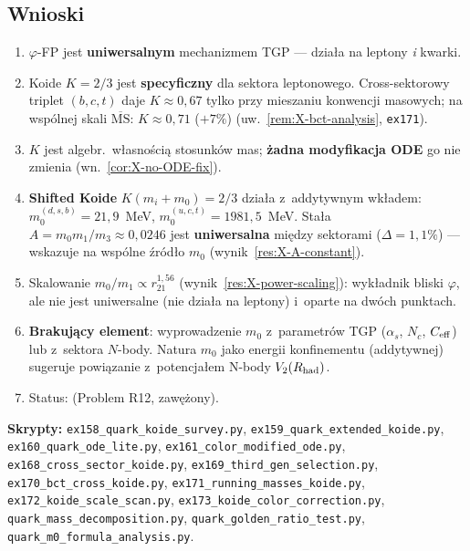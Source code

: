 \subsection{Wnioski}\label{app:X-wnioski}

\begin{enumerate}[nosep]
  \item $\varphi$-FP jest \textbf{uniwersalnym} mechanizmem TGP ---
        dzia\l{}a na leptony \emph{i} kwarki.
  \item Koide $K = 2/3$ jest \textbf{specyficzny} dla sektora leptonowego.
        Cross-sektorowy triplet $(b, c, t)$ daje $K \approx 0{,}67$
        tylko przy mieszaniu konwencji masowych; na wsp\'olnej skali
        $\overline{\text{MS}}$: $K \approx 0{,}71$ ($+7\%$)
        (uw.~\ref{rem:X-bct-analysis}, \texttt{ex171}).
  \item $K$ jest algebr.\ w\l{}asno\'sci\k{a} stosunk\'ow mas;
        \textbf{\.zadna modyfikacja ODE} go nie zmienia (wn.~\ref{cor:X-no-ODE-fix}).
  \item \textbf{Shifted Koide} $K(m_i + m_0) = 2/3$ dzia\l{}a
        z~addytywnym wk\l{}adem:
        $m_0^{(d,s,b)} = 21{,}9$~MeV,\;
        $m_0^{(u,c,t)} = 1981{,}5$~MeV.
        Sta\l{}a $A = m_0 m_1/m_3 \approx 0{,}0246$ jest
        \textbf{uniwersalna} mi\k{e}dzy sektorami ($\Delta = 1{,}1\%$)
        --- wskazuje na wsp\'olne \'zr\'od\l{}o $m_0$ (wynik~\ref{res:X-A-constant}).
  \item Skalowanie $m_0/m_1 \propto r_{21}^{1{,}56}$ (wynik~\ref{res:X-power-scaling}):
        wyk\l{}adnik bliski $\varphi$, ale nie jest uniwersalne (nie dzia\l{}a
        na leptony) i~oparte na dw\'och punktach.
  \item \textbf{Brakuj\k{a}cy element}: wyprowadzenie $m_0$ z~parametr\'ow TGP
        ($\alpha_s$, $N_c$, $C_{\rm eff}$) lub z~sektora $N$-body.
        Natura $m_0$ jako energii konfinementu (addytywnej) sugeruje
        powi\k{a}zanie z~potencja\l{}em N-body $V_2(R_{\rm had})$.
  \item Status:  (Problem R12, zaw\k{e}\.zony).
\end{enumerate}

\noindent\textbf{Skrypty:}
\texttt{ex158\_quark\_koide\_survey.py},
\texttt{ex159\_quark\_extended\_koide.py},
\texttt{ex160\_quark\_ode\_lite.py},
\texttt{ex161\_color\_modified\_ode.py},
\texttt{ex168\_cross\_sector\_koide.py},
\texttt{ex169\_third\_gen\_selection.py},
\texttt{ex170\_bct\_cross\_koide.py},
\texttt{ex171\_running\_masses\_koide.py},
\texttt{ex172\_koide\_scale\_scan.py},
\texttt{ex173\_koide\_color\_correction.py},
\texttt{quark\_mass\_decomposition.py},
\texttt{quark\_golden\_ratio\_test.py},
\texttt{quark\_m0\_formula\_analysis.py}.

